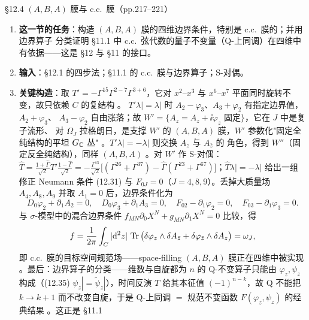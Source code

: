 \begin{kcard}{\S12.4 $(A,B,A)$ 膜与 c.c.\ 膜（pp.217--221）}
\begin{enumerate}[label=\textbf{\arabic*}]
\item \textbf{这一节的任务}：构造 $(A,B,A)$ 膜的四维边界条件，特别是 c.c.\ 膜的；并用边界算子
  分类证明 \S11.1 中 c.c.\ 弦代数的量子不变量（Q-上同调）在四维中有依据——这是 \S12 与
  \S11 的接口。
\item \textbf{输入}：\S12.1 的四步法；\S11.1 的 c.c.\ 膜与边界算子；S-对偶。
\item \textbf{关键构造}：取 $T'=-\Gamma^{15}\Gamma^{2-7}\Gamma^{3+6}$，它对 $x^2$--$x^3$ 与
  $x^6$--$x^7$ 平面同时旋转不变，故只依赖 $C$ 的复结构 \pA{}。
  $T'\lambda|=\lambda|$ 时 $A_2-\varphi_3$、$A_3+\varphi_2$ 有指定边界值，$A_2+\varphi_3$、
  $A_3-\varphi_2$ 自由涨落；故 $W'=\{A_z=A_z+\ii\varphi_z$ 固定$\}$，它在 $J$ 中是复子流形、
  对 $\Omega_J$ 拉格朗日，是支撑 $W'$ 的 $(A,B,A)$ 膜，$W'$ 参数化"固定全纯结构的平坦
  $G_{\mathbb{C}}$ 丛" \pA{}。$T'\lambda|=-\lambda|$ 则交换 $A_z$ 与 $A_{\bar z}$ 的
  角色，得到 $W''$（固定反全纯结构），同样 $(A,B,A)$ \pA{}。对 $W'$ 作 S-对偶：
  $\widehat T=\frac{1+\hat\Gamma}{\sqrt2}T'\frac{1-\hat\Gamma}{\sqrt2}
  =-\frac{\Gamma^{15}}{\sqrt2}\big[(\Gamma^{26}+\Gamma^{37})
  -\hat\Gamma(\Gamma^{23}+\Gamma^{67})\big]$；$\widehat T\lambda|=-\lambda|$ 给出一组修正
  Neumann 条件 (12.31) 与 $F_{0J}=0$（$J=4,8,9$）\pA{}。丢掉大质量场
  $A_4,A_8,A_9$ 并取 $A_1=0$ 后，边界条件化为
\begin{equation}
D_0\varphi_2+\partial_1A_2=0,\quad D_0\varphi_3+\partial_1A_3=0,\quad
F_{02}-\partial_1\varphi_2=0,\quad F_{03}-\partial_1\varphi_3=0 .
\label{eq:geom-aba-bc}
\end{equation}
  与 $\sigma$-模型中的混合边界条件 $f_{MN}\partial_0X^N+g_{MN}\partial_1X^N=0$ 比较，得
\begin{equation}
f=\frac{1}{2\pi}\int_C|\mathrm{d}^2z|\,\operatorname{Tr}\big(\delta\varphi_z\wedge\delta A_{\bar z}
+\delta\varphi_{\bar z}\wedge\delta A_z\big)=\omega_J ,
\label{eq:geom-cc-curvature}
\end{equation}
  即 c.c.\ 膜的目标空间规范场——space-filling $(A,B,A)$ 膜正在四维中被实现
  \pA{}。最后：边界算子的分类——维数与自旋都为 $n$ 的 Q-不变算子只能由
  $\varphi_z,\psi_z$ 构成（(12.35) $\psi_z|=\tilde\psi_z|$），时间反演 $T$ 给其本征值
  $(-1)^{n-k}$，故 Q 不能把 $k\to k+1$ 而不改变自旋，于是 Q-上同调 $=$ 规范不变函数
  $F(\varphi_z,\psi_z)$ 的经典结果 \pA{}。这正是 \S11.1

\end{enumerate}
\end{kcard}
